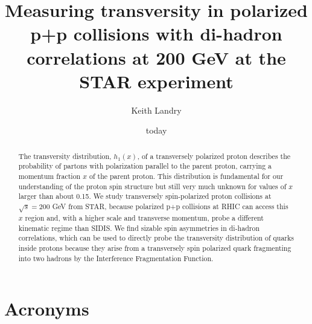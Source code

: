 \documentclass[letterpaper, abstract = on,listof=totoc, bibliography=totoc]{scrreprt}
\begin{document}
\title{Measuring transversity in polarized p+p collisions with di-hadron correlations at  200 GeV at the STAR experiment}
\author{Keith Landry}
\date{today}
\maketitle

\begin{abstract}
The transversity distribution, $h_1(x)$, of a transversely polarized proton describes the probability of partons with polarization parallel to the parent proton, carrying a momentum fraction $x$ of the parent proton. This distribution is fundamental for our understanding of the proton spin structure but still very much unknown for values of $x$ larger than about 0.15. %
We study transversely spin-polarized proton collisions at $\sqrt{s}=200$ GeV from STAR, because polarized p+p collisions at RHIC can access this $x$ region and, with a higher scale and transverse momentum,  probe a different kinematic regime than SIDIS. We find sizable spin asymmetries in di-hadron correlations, which can be used to directly probe the transversity distribution of quarks inside protons because they arise from a transversely spin polarized quark fragmenting into two hadrons by the Interference Fragmentation Function. 
\end{abstract}

\tableofcontents
\listoffigures
\listoftables


\chapter*{Acronyms}
 
\end{document}
